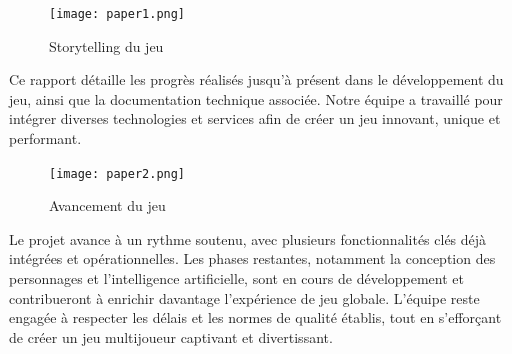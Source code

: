 \documentclass[
	article,			%
	11pt,				%
	oneside,			%
	a4paper,			%
	chapter=TITLE,
	french,			%
	sumario=tradicional
	]{base_nt}
\begin{document}

\frenchspacing 


%
%
\maketitle

\newpage
\vspace{0cm}
\begin{figure}[ht]
	\caption{Storytelling du jeu}
	\centering
	\texttt{[image: paper1.png]}
	
\end{figure}

Ce rapport détaille les progrès réalisés jusqu'à présent dans le développement du jeu, ainsi que la documentation technique associée. Notre équipe a travaillé pour intégrer diverses technologies et services afin de créer un jeu innovant, unique et performant.

\vspace{0cm}
\begin{figure}[ht]
	\caption{Avancement du jeu}
	\centering
	\texttt{[image: paper2.png]}
	
\end{figure}

Le projet avance à un rythme soutenu, avec plusieurs fonctionnalités clés déjà intégrées et opérationnelles. Les phases restantes, notamment la conception des personnages et l'intelligence artificielle, sont en cours de développement et contribueront à enrichir davantage l'expérience de jeu globale. L'équipe reste engagée à respecter les délais et les normes de qualité établis, tout en s'efforçant de créer un jeu multijoueur captivant et divertissant.

\textual

\newpage

\customtableofcontents

\newpage
\end{document}
